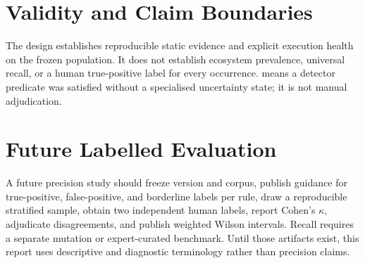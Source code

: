 \section{Validity and Claim Boundaries}
The design establishes reproducible static evidence and explicit execution
health on the frozen population. It does not establish ecosystem prevalence,
universal recall, or a human true-positive label for every occurrence.
 means a detector predicate was satisfied without a specialised
uncertainty state; it is not manual adjudication.

\section{Future Labelled Evaluation}
\label{sec:future_eval}
A future precision study should freeze version and corpus, publish guidance for
true-positive, false-positive, and borderline labels per rule, draw a
reproducible stratified sample, obtain two
independent human labels, report Cohen's $\kappa$, adjudicate disagreements,
and publish weighted Wilson intervals. Recall requires a separate mutation or
expert-curated benchmark. Until those artifacts exist, this report uses
descriptive and diagnostic terminology rather than precision claims.
